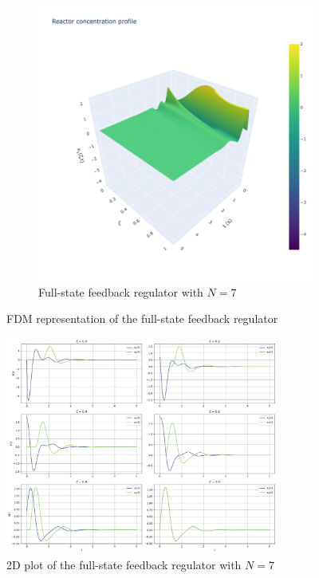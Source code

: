 \begin{figure}[H]
\begin{subfigure}[b]{0.45\textwidth}
        \includegraphics[width=\textwidth]{Figures/3D_x1_k7.png}
        \caption{Full-state feedback regulator with $N=7$}
        \label{fig:3D_x1_k7}
    \end{subfigure}
    \caption{FDM representation of the full-state feedback regulator}
    \label{fig:full_state_feedback}
\end{figure}

\begin{figure}[H]
    \centering
    \includegraphics[width=0.8\textwidth]{Figures/2D_xt_k7.png}
    \caption{2D plot of the full-state feedback regulator with $N=7$}
    \label{fig:2D_xt_k7}
\end{figure}

